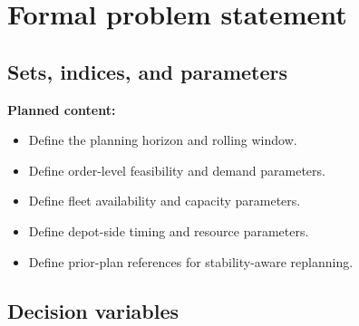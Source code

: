 \section{Formal problem statement}
\label{sec:chapter03_formal_problem_statement}

%
%

\subsection{Sets, indices, and parameters}
\label{subsec:chapter03_sets_parameters}


\noindent\textbf{Planned content:}
\begin{itemize}
    \item Define the planning horizon and rolling window.
    \item Define order-level feasibility and demand parameters.
    \item Define fleet availability and capacity parameters.
    \item Define depot-side timing and resource parameters.
    \item Define prior-plan references for stability-aware replanning.
\end{itemize}

\subsection{Decision variables}
\label{subsec:chapter03_decision_variables}

%

